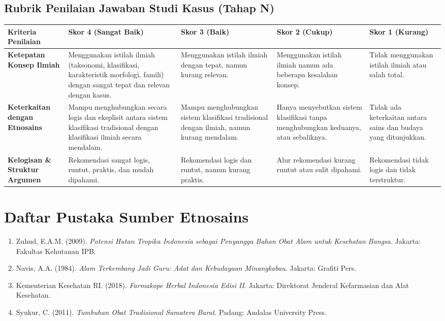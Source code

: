 \documentclass[a4paper,12pt]{article}
\begin{document}
\subsection{Rubrik Penilaian Jawaban Studi Kasus (Tahap N)}

\begin{longtable}{|p{3cm}|p{3cm}|p{3cm}|p{3cm}|p{3cm}|}
\hline
\textbf{Kriteria Penilaian} & \textbf{Skor 4 (Sangat Baik)} & \textbf{Skor 3 (Baik)} & \textbf{Skor 2 (Cukup)} & \textbf{Skor 1 (Kurang)} \\
\hline
\textbf{Ketepatan Konsep Ilmiah} & Menggunakan istilah ilmiah (taksonomi, klasifikasi, karakteristik morfologi, famili) dengan sangat tepat dan relevan dengan kasus. & Menggunakan istilah ilmiah dengan tepat, namun kurang relevan. & Menggunakan istilah ilmiah namun ada beberapa kesalahan konsep. & Tidak menggunakan istilah ilmiah atau salah total. \\
\hline
\textbf{Keterkaitan dengan Etnosains} & Mampu menghubungkan secara logis dan eksplisit antara sistem klasifikasi tradisional dengan klasifikasi ilmiah secara mendalam. & Mampu menghubungkan sistem klasifikasi tradisional dengan ilmiah, namun kurang mendalam. & Hanya menyebutkan sistem klasifikasi tanpa menghubungkan keduanya, atau sebaliknya. & Tidak ada keterkaitan antara sains dan budaya yang ditunjukkan. \\
\hline
\textbf{Kelogisan \& Struktur Argumen} & Rekomendasi sangat logis, runtut, praktis, dan mudah dipahami. & Rekomendasi logis dan runtut, namun kurang praktis. & Alur rekomendasi kurang runtut atau sulit dipahami. & Rekomendasi tidak logis dan tidak terstruktur. \\
\hline
\end{longtable}

\section{Daftar Pustaka Sumber Etnosains}

\begin{enumerate}
\item Zuhud, E.A.M. (2009). \textit{Potensi Hutan Tropika Indonesia sebagai Penyangga Bahan Obat Alam untuk Kesehatan Bangsa}. Jakarta: Fakultas Kehutanan IPB.
\item Navis, A.A. (1984). \textit{Alam Terkembang Jadi Guru: Adat dan Kebudayaan Minangkabau}. Jakarta: Grafiti Pers.
\item Kementerian Kesehatan RI. (2018). \textit{Farmakope Herbal Indonesia Edisi II}. Jakarta: Direktorat Jenderal Kefarmasian dan Alat Kesehatan.
\item Syukur, C. (2011). \textit{Tumbuhan Obat Tradisional Sumatera Barat}. Padang: Andalas University Press.
\end{enumerate}
\end{document}
